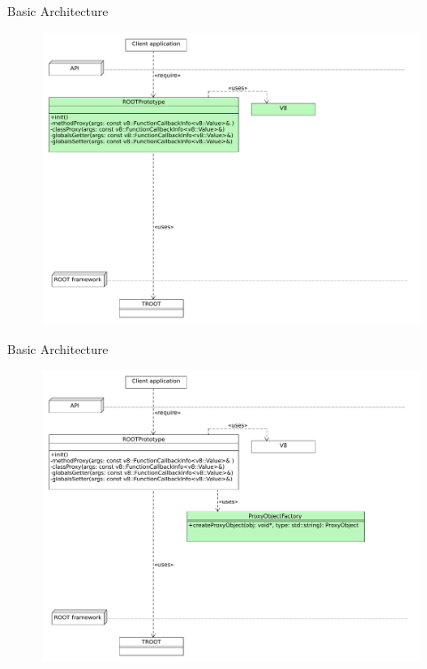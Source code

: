 \begin{frame}{Basic Architecture}
  \begin{figure}[htb]
    \centering
      \includegraphics[width=\textwidth, height=.85\textheight, keepaspectratio]{./resources/architecture/architecture_h2.pdf}
  \end{figure}
\end{frame}

\begin{frame}{Basic Architecture}
  \begin{figure}[htb]
    \centering
      \includegraphics[width=\textwidth, height=.85\textheight, keepaspectratio]{./resources/architecture/architecture_h3.pdf}
  \end{figure}
\end{frame}

